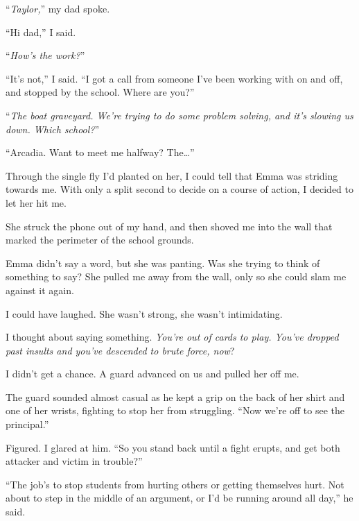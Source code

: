 ``\emph{Taylor,}'' my dad spoke.



``Hi dad,'' I said.



``\emph{How's the work?}''



``It's not,'' I said.  ``I got a call from someone I've been working with on and off, and stopped by the school.  Where are you?''



``\emph{The boat graveyard.  We're trying to do some problem solving, and it's slowing us down.  Which school?}''



``Arcadia.  Want to meet me halfway?  The\ldots''



Through the single fly I'd planted on her, I could tell that Emma was striding towards me.  With only a split second to decide on a course of action, I decided to let her hit me.



She struck the phone out of my hand, and then shoved me into the wall that marked the perimeter of the school grounds.



Emma didn't say a word, but she was panting.  Was she trying to think of something to say?  She pulled me away from the wall, only so she could slam me against it again.



I could have laughed.  She wasn't strong, she wasn't intimidating.



I thought about saying something.  \emph{You're out of cards to play.  You've dropped past insults and you've descended to brute force, now}?



I didn't get a chance.  A guard advanced on us and pulled her off me.



The guard sounded almost casual as he kept a grip on the back of her shirt and one of her wrists, fighting to stop her from struggling.  ``Now we're off to see the principal.''



Figured.  I glared at him.  ``So you stand back until a fight erupts, and get both attacker and victim in trouble?''



``The job's to stop students from hurting others or getting themselves hurt.  Not about to step in the middle of an argument, or I'd be running around all day,'' he said.



